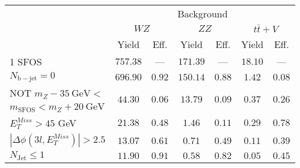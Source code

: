 \begin{tabular}{l||c|c||c|c||c|c}
\hline
 &       \multicolumn{6}{c}{Background}\\
 &  \multicolumn{2}{c||}{$WZ$} & \multicolumn{2}{c||}{$ZZ$} & \multicolumn{2}{c}{$t\bar{t}+V$} \\ 
 & Yield & Eff. & Yield & Eff. & Yield & Eff. \\
\hline\hline
1 SFOS &  $757.38$ &  --- &  $171.39$ &  --- &  $18.10$ &  --- \\ 
\hline
$N_{\mathrm{b-jet}} = 0$ &  $696.90$ &  $0.92$ &  $150.14$ &  $0.88$ &  $1.42$ &  $0.08$\\ 
\hline
NOT $m_Z - 35~\mathrm{GeV} <$  &  \multirow{2}{*}{$44.30$} &  \multirow{2}{*}{$0.06$} &  \multirow{2}{*}{$13.79$} &  \multirow{2}{*}{$0.09$} &  \multirow{2}{*}{$0.37$} &  \multirow{2}{*}{$0.26$} \\ 
$ m_{\mathrm{SFOS}} < m_Z + 20~\mathrm{GeV}$ & & & &  & & \\
\hline
$E_{T}^{Miss} > 45$ GeV &  $21.38$ &  $0.48$ &  $1.46$ &  $0.11$ &  $0.29$ &  $0.78$ \\ 
\hline
$|\Delta\phi(3l,E_{T}^{Miss})| > 2.5$ &  $13.07$ &  $0.61$ &  $0.71$ &  $0.49$ &  $0.11$ &  $0.39$ \\ 
\hline
$N_{\mathrm{Jet}} \leq 1$ &  $11.90$ &  $0.91$ &  $0.58$ &  $0.82$ &  $0.05$ &  $0.45$ \\ 
\hline
\end{tabular}
